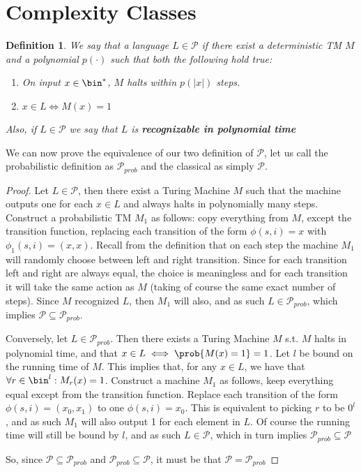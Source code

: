 \documentclass{article}
\newtheorem{definition}{Definition}
\begin{document}
\section{Complexity Classes}
\begin{definition}
We say that a language $L \in \mathcal{P}$ if there exist a deterministic TM $M$ and a polynomial $p(\cdot)$ such that both the following hold true:
\begin{enumerate}
    \item On input $x \in \bin^*$, $M$ halts within $p(|x|)$ steps.
    \item $x \in L \iff M(x) = 1$
\end{enumerate}
Also, if $L \in \mathcal{P}$ we say that $L$ is \textbf{recognizable in polynomial time}
\end{definition}

We can now prove the equivalence of our two definition of $\mathcal{P}$, let us call the probabilistic definition as $\mathcal{P}_{prob}$ and the classical as simply $\mathcal{P}$.

\begin{proof}
Let $L \in \mathcal{P}$, then there exist a Turing Machine $M$ such that the machine outputs one for each $x \in L$ and always halts in polynomially many steps. 
Construct a probabilistic TM $M_1$ as follows: copy everything from $M$, except the transition function, replacing each transition of the form $\phi(s, i) = x$ with $\phi_1(s, i) = (x, x)$. Recall from the definition that on each step the machine $M_1$ will randomly choose between left and right transition. Since for each transition left and right are always equal, the choice is meaningless and for each transition it will take the same action as $M$ (taking of course the same exact number of steps). Since $M$ recognized $L$, then $M_1$ will also, and as such $L \in \mathcal{P}_{prob}$, which implies $\mathcal{P} \subseteq \mathcal{P}_{prob}$.  \par

Conversely, let $L \in \mathcal{P}_{prob}$. Then there exists a Turing Machine $M$ s.t. $M$ halts in polynomial time, and that $ x \in L \iff \prob{M(x) = 1} = 1$. Let $l$ be bound on the running time of $M$. This implies that, for any $x \in L$, we have that $\forall r \in \bin^l : M_r(x) = 1$. Construct a machine $M_1$ as follows, keep everything equal except from the transition function. Replace each transition of the form $\phi(s, i) = (x_0, x_1)$ to one $\phi(s, i) = x_0$. This is equivalent to picking $r$ to be $0^l$, and as such $M_1$ will also output 1 for each element in $L$. Of course the running time will still be bound by $l$, and as such $L \in \mathcal{P}$, which in turn implies $\mathcal{P}_{prob} \subseteq \mathcal{P}$  \par

So, since $\mathcal{P} \subseteq \mathcal{P}_{prob}$ and $\mathcal{P}_{prob} \subseteq \mathcal{P}$, it must be that $\mathcal{P} = \mathcal{P}_{prob}$
\end{proof}
\end{document}

